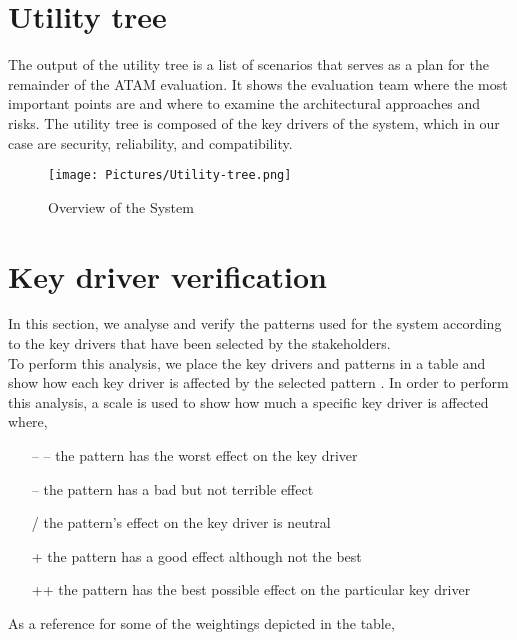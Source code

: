 \section{Utility tree}
The output of the utility tree is a list of scenarios that serves as a plan
for the remainder of the ATAM evaluation. It shows the evaluation team
where the most important points are and where to examine the architectural
approaches and risks. The utility tree is composed of the key drivers of the
system, which in our case are security, reliability, and compatibility.

\begin{figure}[H]
  \centering
  \texttt{[image: Pictures/Utility-tree.png]}
  \caption{Overview of the System}
  \label{fig:system}
\end{figure}

\section{Key driver verification}
In this section, we analyse and verify the patterns used for the system according to the key drivers that have been selected by the stakeholders.\\
To perform this analysis, we place the key drivers and patterns in a table and show how each key driver is affected by the selected pattern \cite{web:patterns-v-QAs} . In order to perform this analysis, a scale is used to show how much a specific key driver is affected where,
\begin{description}
\begin{itemize}
  \item[-- --] the pattern has the worst effect on the key driver
  \item[--] the pattern has a bad but not terrible effect
  \item[/] the pattern's effect on the key driver is neutral
  \item[+] the pattern has a good effect although not the best  
  \item[++] the pattern has the best possible effect on the particular key driver
\end{itemize}
\end{description}
As a reference for some of the weightings depicted in the table, 

